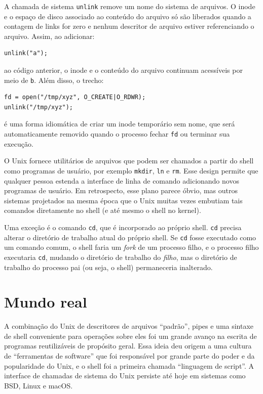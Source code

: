 A chamada de sistema
\lstinline{unlink}
remove um nome do sistema de arquivos.
O inode e o espaço de disco associado ao conteúdo do arquivo
só são liberados quando a contagem de links for zero e
nenhum descritor de arquivo estiver referenciando o arquivo.
Assim, ao adicionar:
\begin{lstlisting}[]
unlink("a");
\end{lstlisting}
ao código anterior, o inode
e o conteúdo do arquivo continuam acessíveis por meio de
\lstinline{b}.
Além disso, o trecho:
\begin{lstlisting}[]
fd = open("/tmp/xyz", O_CREATE|O_RDWR);
unlink("/tmp/xyz");
\end{lstlisting}
é uma forma idiomática de criar um inode temporário
sem nome,
que será automaticamente removido quando o processo fechar
\lstinline{fd}
ou terminar sua execução.

O Unix fornece
utilitários de arquivos que podem ser chamados a partir do shell
como programas de usuário, por exemplo
\lstinline{mkdir},
\lstinline{ln}
e
\lstinline{rm}.
Esse design permite que qualquer pessoa estenda a interface de linha de comando
adicionando novos programas de usuário.
Em retrospecto, esse plano parece óbvio,
mas outros sistemas projetados na mesma época que o Unix muitas vezes embutiam tais comandos diretamente
no shell (e até mesmo o shell no kernel).

Uma exceção é o comando
\lstinline{cd},
que é incorporado ao próprio shell.
\lstinline{cd}
precisa alterar o diretório de trabalho atual do
próprio shell.
Se
\lstinline{cd}
fosse executado como um comando comum, o shell faria um
\textit{fork} de um processo filho, e o processo filho executaria
\lstinline{cd},
mudando o diretório de trabalho do
\textit{filho},
mas o diretório de trabalho do processo pai (ou seja, o shell)
permaneceria inalterado.

\section{Mundo real}

A combinação do Unix de descritores de arquivos “padrão”,
pipes e uma sintaxe de shell conveniente para operações sobre eles
foi um grande avanço na escrita de programas reutilizáveis de propósito geral.
Essa ideia deu origem a uma cultura de “ferramentas de software” que foi
responsável por grande parte do poder e da popularidade do Unix,
e o shell foi a primeira chamada “linguagem de script”.
A interface de chamadas de sistema do Unix persiste até hoje em sistemas como
BSD, Linux e macOS.

